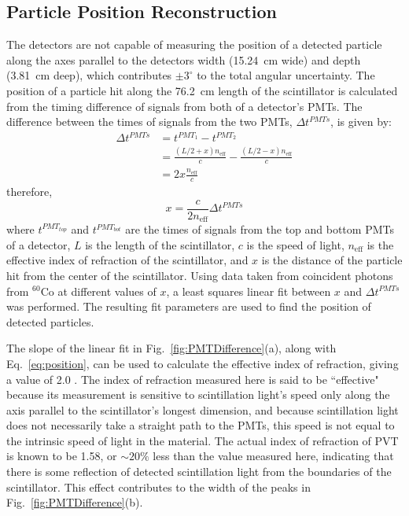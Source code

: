 \subsection{Particle Position Reconstruction}
The detectors are not capable of measuring the position of a detected particle along the axes parallel to the detectors width (15.24~cm wide) and depth (3.81~cm deep), which contributes $\pm3^{\circ}$ to the total angular uncertainty.
The position of a particle hit along the 76.2~cm length of the scintillator is calculated from the timing difference of signals from both of a detector's PMTs.
The difference between the times of signals from the two PMTs, $\Delta t^{PMTs}$, is given by:
\begin{equation}
\begin{split}
\Delta t^{PMTs} & = t^{PMT_1}-t^{PMT_2} \\ 
& = \frac{(L/2 + x) n_{\text{eff}}}{c} - \frac{(L/2-x) n_{\text{eff}}}{c} \\
& = 2x \frac{n_{\text{eff}}}{c} 
\end{split}
\end{equation}
therefore, 
\begin{equation}
\label{eq:position}
x = \frac{c}{2n_{\text{eff}}} \Delta t^{PMTs} 
\end{equation}
where $t^{PMT_{top}}$ and $t^{PMT_{bot}}$ are the times of signals from the top and bottom PMTs of a detector, $L$ is the length of the scintillator, $c$ is the speed of light, $n_{\text{eff}}$ is the effective index of refraction of the scintillator, and $x$ is the distance of the particle hit from the center of the scintillator.
Using data taken from coincident photons from $^{60}$Co at different values of $x$, a least squares linear fit between $x$ and $\Delta t^{PMTs}$ was performed.
The resulting fit parameters are used to find the position of detected particles.

The slope of the linear fit in Fig.~\ref{fig:PMTDifference}(a), along with Eq.~\ref{eq:position}, can be used to calculate the effective index of refraction, giving a value of 2.0 .
The index of refraction measured here is said to be ``effective" because its measurement is sensitive to scintillation light's speed only along the axis parallel to the scintillator's longest dimension, and because scintillation light does not necessarily take a straight path to the PMTs, this speed is not equal to the intrinsic speed of light in the material.
The actual index of refraction of PVT is known to be 1.58, or $\sim{20}\%$ less than the value measured here, indicating that there is some reflection of detected scintillation light from the boundaries of the scintillator.
This effect contributes to the width of the peaks in Fig.~\ref{fig:PMTDifference}(b).

